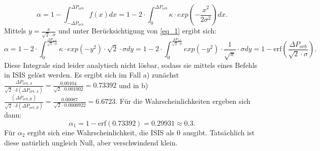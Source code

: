 \documentclass[titlepage]{scrartcl}
\begin{document}
\begin{equation}
\alpha = 1 - \int_{-\Delta P_{orb}} ^{\Delta P_{orb}} f(x) dx = 1- 2\cdot \int_{0} ^{\Delta P_{orb}} \kappa \cdot exp(-\frac{x^2}{2\sigma^2}) dx. 
\end{equation}
Mittels $ y = \frac{x}{\sqrt{2} \cdot \sigma}$ und unter Berücksichtigung von \eqref{eq_1} ergibt sich:
\begin{equation}
\alpha = 1- 2\cdot \int_{0} ^{\frac{\Delta P_{orb}}{\sqrt{2}\cdot \sigma}} \kappa \cdot exp(-y^2) \cdot \sqrt{2} \cdot \sigma dy = 1- 2\cdot \int_{0} ^{\frac{\Delta P_{orb}}{\sqrt{2}\cdot \sigma}} exp(-y^2) \cdot \frac{1}{\sqrt{\pi}}\cdot \sigma dy = 1- \mathrm{erf}(\frac{\Delta P_{orb}}{\sqrt{2}\cdot \sigma}). 
\end{equation}
Diese Integrale sind leider analytisch nicht lösbar, sodass sie mittels eines Befehls in ISIS gelöst werden. 
Es ergibt sich im Fall a) zunächst $\frac{\Delta P_{orb,A}}{\sqrt{2} \cdot \delta (\Delta P_{orb,A})} = \frac{0.00104}{\sqrt{2} \cdot 0.001002} = 0.73392$ und in b) $\frac{(\Delta P_{orb,B})}{\sqrt{2} \cdot \delta (\Delta P_{orb,B})} = \frac{0.00087}{\sqrt{2} \cdot 0.0000922} = 6.6723$. 
Für die Wahrscheinlichkeiten ergeben sich dann: 
\begin{equation}
\alpha_1 = 1- \mathrm{erf}(0.73392) = 0.29931 \approx 0.3. 
\end{equation}
Für $\alpha_2$ ergibt sich eine Wahrscheinlichkeit, die ISIS als 0 ausgibt. Tatsächlich ist diese natürlich ungleich Null, aber verschwindend klein. 



\begin{comment}
\begin{thebibliography}{9}
\bibitem[Bec]{kmann} BECKMANN, Dieter. Astrophysik. C.C.Buchner, 2011.
\bibitem[Ort]{szeit} Wikipedia: Ortszeit. Online im Internet: URL: http://de.wikipedia.org/wiki/Ortszeit (Stand: 01.03.2014). 


\end{thebibliography}
\end{comment}
\end{document}
